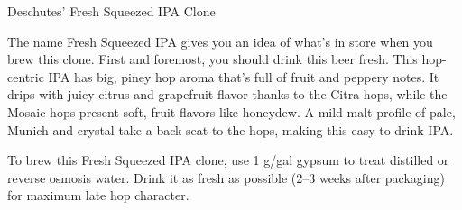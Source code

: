 \begin{recipie}{Deschutes' Fresh Squeezed IPA Clone}

\begin{aboutblock}
The name Fresh Squeezed IPA gives you an idea of what's in store when you brew this clone. First and
foremost, you should drink this beer fresh. This hop-centric IPA has big, piney hop aroma that's full
of fruit and peppery notes. It drips with juicy citrus and grapefruit flavor thanks to the Citra hops,
while the Mosaic hops present soft, fruit flavors like honeydew. A mild malt profile of pale, Munich
and crystal take a back seat to the hops, making this easy to drink IPA.
\end{aboutblock}


\begin{methodandtiming}
 
\begin{mashsteps}
\end{mashsteps}

\begin{fermentationsteps}
\end{fermentationsteps}

\begin{directions}
To brew this Fresh Squeezed IPA clone, use 1 g/gal gypsum to treat distilled or reverse osmosis water. Drink it as fresh as possible (2--3 weeks after packaging) for maximum late hop character.
\end{directions}

\end{methodandtiming}

\pagebreak

\begin{ingredientsblock}

\begin{malts}
\end{malts}

\begin{hops}

\end{hops}

\begin{yeasts}
\end{yeasts}

\end{ingredientsblock}

\end{recipie}

